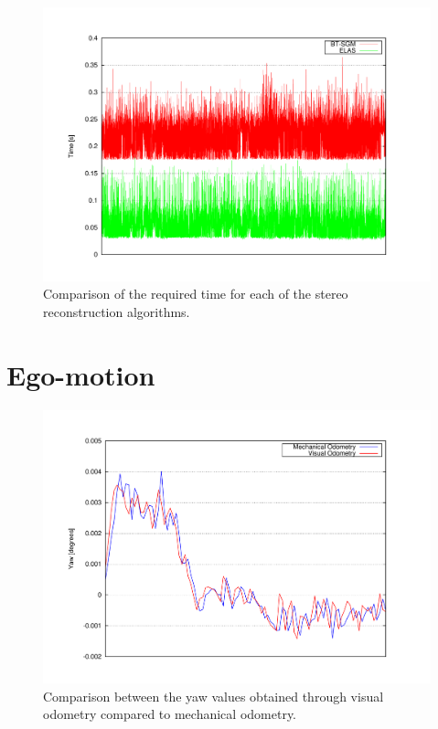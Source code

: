  \begin{figure}[th]
  \centering
  \includegraphics[trim=50 50 90 60, clip]{timesELAS_OPENCV}
  \caption{Comparison of the required time for each of the stereo reconstruction algorithms.}\label{fig:cp05_times_elas_btsgm}
\end{figure}

\section{Ego-motion}\label{ch:chapter05_02_02}
 \begin{figure}[th]
  \centering
  \includegraphics[trim=50 50 90 60, clip]{yaw}
  \caption{Comparison between the yaw values obtained through visual odometry compared to mechanical odometry.}\label{fig:cp05_ego_yaw}
\end{figure}

